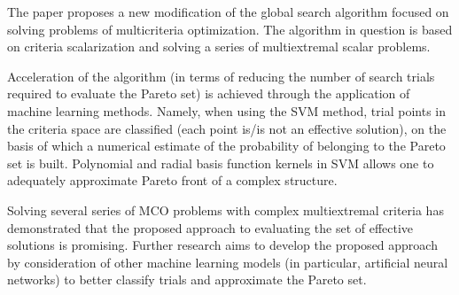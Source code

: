 \documentclass[runningheads]{llncs}
\begin{document}
The paper proposes a new modification of the global search algorithm focused on solving problems of multicriteria optimization. The algorithm in question is based on criteria scalarization and solving a series of multiextremal scalar problems.

Acceleration of the algorithm (in terms of reducing the number of search trials required to evaluate the Pareto set) is achieved through the application of machine learning methods. Namely, when using the SVM method, trial points in the criteria space are classified (each point is/is not an effective solution), on the basis of which a numerical estimate of the probability of belonging to the Pareto set is built. Polynomial and radial basis function kernels in SVM allows one to adequately approximate Pareto front of a complex structure.

Solving several series of MCO problems with complex multiextremal criteria has demonstrated that the proposed approach to evaluating the set of effective solutions is promising. Further research aims to develop the proposed approach by consideration of other machine learning models (in particular, artificial neural networks) to better classify trials and approximate the Pareto set.



%
%
%
 
 
%
%
%
%
%
\end{document}
